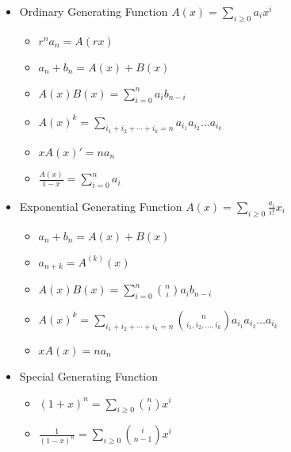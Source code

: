 \begin{itemize}
\item Ordinary Generating Function
$A(x) = \sum_{i\ge 0} a_ix^i$
\begin{itemize}
    \itemsep-0.5em
    \item $r^na_n            = A(rx)$
    \item $a_n + b_n         = A(x) + B(x)$
    \item $A(x)B(x)          = \sum_{i=0}^{n} a_ib_{n-i}$
    \item $A(x)^k            = \sum_{i_1+i_2+\cdots+i_k=n} a_{i_1}a_{i_2}\ldots a_{i_k}$
    \item $xA(x)'            = na_n$
    \item $\frac{A(x)}{1-x}  = \sum_{i=0}^{n} a_i$
\end{itemize}
\item Exponential Generating Function
$A(x) = \sum_{i\ge 0} \frac{a_i}{i!}x_i$
\begin{itemize}
    \itemsep-0.5em
    \item $a_n + b_n         = A(x) + B(x)$
    \item $a_{n+k}           = A^{(k)}(x)$
    \item $A(x)B(x)          = \sum_{i=0}^{n} \binom{n}{i}a_ib_{n-i}$
    \item $A(x)^k            = \sum_{i_1+i_2+\cdots+i_k=n} \binom{n}{i_1, i_2, \ldots, i_k}a_{i_1}a_{i_2}\ldots a_{i_k}$
    \item $xA(x)             = na_n$
\end{itemize}
\item Special Generating Function
\begin{itemize}
    \itemsep-0.5em
    \item $(1+x)^n           = \sum_{i\ge 0} \binom{n}{i}x^i$
    \item $\frac{1}{(1-x)^n} = \sum_{i\ge 0} \binom{i}{n-1}x^i$
\end{itemize}
\end{itemize}
